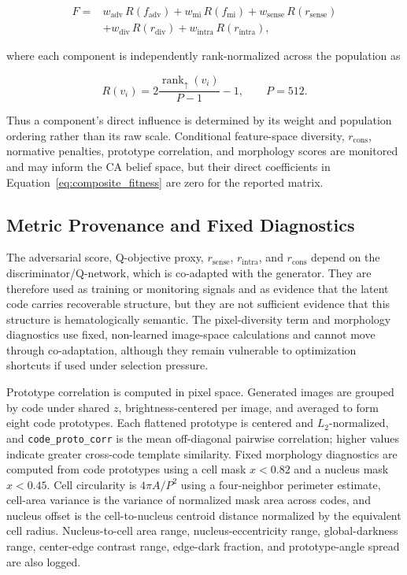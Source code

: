 \begin{equation}
\begin{aligned}
F = {} & w_{\text{adv}}\,R(f_{\text{adv}})
+ w_{\text{mi}}\,R(f_{\text{mi}})
+ w_{\text{sense}}\,R(r_{\text{sense}}) \\
& + w_{\text{div}}\,R(r_{\text{div}})
+ w_{\text{intra}}\,R(r_{\text{intra}}),
\end{aligned}
\label{eq:composite_fitness}
\end{equation}

where each component is independently rank-normalized across the population as

\begin{equation}
R(v_i)=2\frac{\operatorname{rank}_{\uparrow}(v_i)}{P-1}-1,
\qquad P=512.
\end{equation}

Thus a component's direct influence is determined by its weight and population ordering rather than its raw scale. Conditional feature-space diversity, $r_{\text{cons}}$, normative penalties, prototype correlation, and morphology scores are monitored and may inform the CA belief space, but their direct coefficients in Equation~\ref{eq:composite_fitness} are zero for the reported matrix.

\subsection{Metric Provenance and Fixed Diagnostics}

The adversarial score, Q-objective proxy, $r_{\text{sense}}$, $r_{\text{intra}}$, and $r_{\text{cons}}$ depend on the discriminator/Q-network, which is co-adapted with the generator. They are therefore used as training or monitoring signals and as evidence that the latent code carries recoverable structure, but they are not sufficient evidence that this structure is hematologically semantic. The pixel-diversity term and morphology diagnostics use fixed, non-learned image-space calculations and cannot move through co-adaptation, although they remain vulnerable to optimization shortcuts if used under selection pressure.

Prototype correlation is computed in pixel space. Generated images are grouped by code under shared $z$, brightness-centered per image, and averaged to form eight code prototypes. Each flattened prototype is centered and $L_2$-normalized, and \texttt{code\_proto\_corr} is the mean off-diagonal pairwise correlation; higher values indicate greater cross-code template similarity. Fixed morphology diagnostics are computed from code prototypes using a cell mask $x<0.82$ and a nucleus mask $x<0.45$. Cell circularity is $4\pi A/P^2$ using a four-neighbor perimeter estimate, cell-area variance is the variance of normalized mask area across codes, and nucleus offset is the cell-to-nucleus centroid distance normalized by the equivalent cell radius. Nucleus-to-cell area range, nucleus-eccentricity range, global-darkness range, center-edge contrast range, edge-dark fraction, and prototype-angle spread are also logged.

